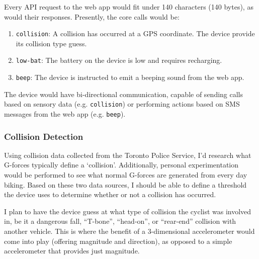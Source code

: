 \documentclass[titlepage]{article}
\begin{document}
Every API request to the web app would fit under 140 characters (140 bytes), as would their responses. Presently, the core calls would be:

\begin{enumerate}
	\item {\tt collision}: A collision has occurred at a GPS coordinate. The device provide its collision type guess.
	\item {\tt low-bat}: The battery on the device is low and requires recharging.
	\item {\tt beep}: The device is instructed to emit a beeping sound from the web app.
\end{enumerate}

The device would have bi-directional communication, capable of sending calls based on sensory data (e.g. {\tt collision}) or performing actions based on SMS messages from the web app (e.g. {\tt beep}).

\subsubsection{Collision Detection}
Using collision data collected from the Toronto Police Service, I'd research what G-forces typically define a `collision'. Additionally, personal experimentation would be performed to see what normal G-forces are generated from every day biking. Based on these two data sources, I should be able to define a threshold the device uses to determine whether or not a collision has occurred.

I plan to have the device guess at what type of collision the cyclist was involved in, be it a dangerous fall, ``T-bone'', ``head-on'', or ``rear-end'' collision with another vehicle. This is where the benefit of a 3-dimensional accelerometer would come into play (offering magnitude and direction), as opposed to a simple accelerometer that provides just magnitude.
\end{document}
